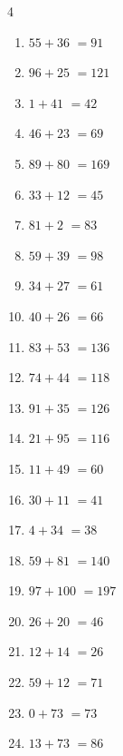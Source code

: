 \begin{multicols}{4}
\begin{enumerate}
  \item $55+36$
        $=91$

  \item $96+25$
        $=121$

  \item $1+41$
        $=42$

  \item $46+23$
        $=69$

  \item $89+80$
        $=169$

  \item $33+12$
        $=45$

  \item $81+2$
        $=83$

  \item $59+39$
        $=98$

  \item $34+27$
        $=61$

  \item $40+26$
        $=66$

  \item $83+53$
        $=136$

  \item $74+44$
        $=118$

  \item $91+35$
        $=126$

  \item $21+95$
        $=116$

  \item $11+49$
        $=60$

  \item $30+11$
        $=41$

  \item $4+34$
        $=38$

  \item $59+81$
        $=140$

  \item $97+100$
        $=197$

  \item $26+20$
        $=46$

  \item $12+14$
        $=26$

  \item $59+12$
        $=71$

  \item $0+73$
        $=73$

  \item $13+73$
        $=86$


\end{enumerate}
\end{multicols}
